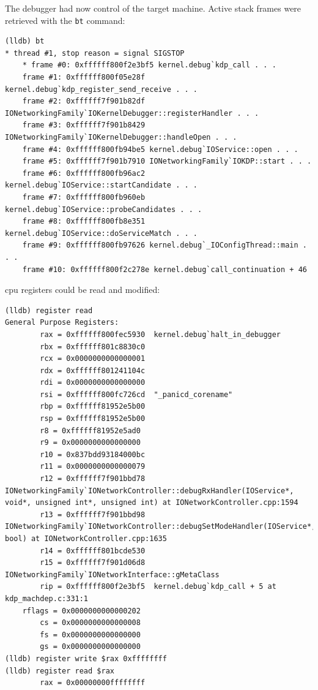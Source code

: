 The debugger had now control of the target machine. Active stack frames were retrieved with the \lstinline{bt} command:
\begin{lstlisting}[style=lldbsession]
(lldb) bt
* thread #1, stop reason = signal SIGSTOP
    * frame #0: 0xffffff800f2e3bf5 kernel.debug`kdp_call . . .
    frame #1: 0xffffff800f05e28f kernel.debug`kdp_register_send_receive . . .
    frame #2: 0xffffff7f901b82df IONetworkingFamily`IOKernelDebugger::registerHandler . . .
    frame #3: 0xffffff7f901b8429 IONetworkingFamily`IOKernelDebugger::handleOpen . . .
    frame #4: 0xffffff800fb94be5 kernel.debug`IOService::open . . .
    frame #5: 0xffffff7f901b7910 IONetworkingFamily`IOKDP::start . . .
    frame #6: 0xffffff800fb96ac2 kernel.debug`IOService::startCandidate . . .
    frame #7: 0xffffff800fb960eb kernel.debug`IOService::probeCandidates . . .
    frame #8: 0xffffff800fb8e351 kernel.debug`IOService::doServiceMatch . . .
    frame #9: 0xffffff800fb97626 kernel.debug`_IOConfigThread::main . . .
    frame #10: 0xffffff800f2c278e kernel.debug`call_continuation + 46
\end{lstlisting}

\gls{cpu} registers could be read and modified:
\begin{lstlisting}[style=lldbsession]
(lldb) register read
General Purpose Registers:
        rax = 0xffffff800fec5930  kernel.debug`halt_in_debugger
        rbx = 0xffffff801c8830c0
        rcx = 0x0000000000000001
        rdx = 0xffffff801241104c
        rdi = 0x0000000000000000
        rsi = 0xffffff800fc726cd  "_panicd_corename"
        rbp = 0xffffff81952e5b00
        rsp = 0xffffff81952e5b00
        r8 = 0xffffff81952e5ad0
        r9 = 0x0000000000000000
        r10 = 0x837bdd93184000bc
        r11 = 0x0000000000000079
        r12 = 0xffffff7f901bbd78  IONetworkingFamily`IONetworkController::debugRxHandler(IOService*, void*, unsigned int*, unsigned int) at IONetworkController.cpp:1594
        r13 = 0xffffff7f901bbd98  IONetworkingFamily`IONetworkController::debugSetModeHandler(IOService*, bool) at IONetworkController.cpp:1635
        r14 = 0xffffff801bcde530
        r15 = 0xffffff7f901d06d8  IONetworkingFamily`IONetworkInterface::gMetaClass
        rip = 0xffffff800f2e3bf5  kernel.debug`kdp_call + 5 at kdp_machdep.c:331:1
    rflags = 0x0000000000000202
        cs = 0x0000000000000008
        fs = 0x0000000000000000
        gs = 0x0000000000000000
(lldb) register write $rax 0xffffffff
(lldb) register read $rax
        rax = 0x00000000ffffffff
\end{lstlisting}

